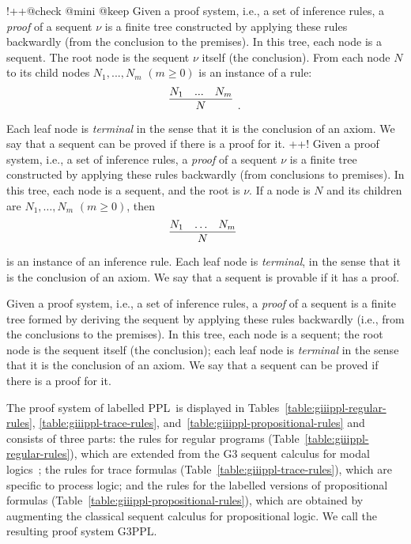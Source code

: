 \documentclass[manuscript,screen]{acmart}
\newcommand{\GiiiPPL}[0]{\mbox{G3PPL}}
\newcommand{\GiiiPPLcyc}[0]{\mbox{G3PPL}}
\newcommand{\PPL}[0]{\mbox{PPL}}
\newcommand{\A}[1]{\mbox{ \textbf{#1} }}
\newcommand{\MO}{\A{MO}}
\newcommand{\EMO}{\A{EMO}}
\begin{document}
\ifx
!++@check @mini @keep
Given a proof system, i.e., a set of inference rules, a \emph{proof} of a sequent $\nu$ is a finite tree constructed by applying these rules backwardly (from the conclusion to the premises). 
In this tree, each node is a sequent. The root node is the sequent $\nu$ itself (the conclusion). 
From each node $N$ to its child nodes $N_1,...,N_m$ $(m\ge 0)$ is an instance of a rule:
$$
\infer[]
{N}
{N_1 & ... & N_m}.
$$
Each leaf node is \emph{terminal} in the sense that it is the conclusion of an axiom. 
We say that a sequent can be proved if there is a proof for it. 
++!
\fi
Given a proof system, i.e., a set of inference rules, a \emph{proof} of a sequent $\nu$ is a finite tree constructed by applying these rules backwardly (from conclusions to premises).
In this tree, each node is a sequent, and the root is $\nu$.
If a node is $N$ and its children are $N_1,\ldots,N_m$ $(m\geq 0)$, then
$$
\infer[]
{N}
{N_1 & \ldots & N_m}
$$
is an instance of an inference rule.
Each leaf node is \emph{terminal}, in the sense that it is the conclusion of an axiom.
We say that a sequent is provable if it has a proof.

\ifx
Given a proof system, i.e., a set of inference rules, a \emph{proof} of a sequent is a finite tree formed by deriving the sequent by applying these rules backwardly (i.e., from the conclusions to the premises). 
In this tree, each node is a sequent; the root node is the sequent itself (the conclusion); each leaf node is \emph{terminal} in the sense that it is the conclusion of an axiom. 
We say that a sequent can be proved if there is a proof for it. 
\fi

The proof system of labelled \PPL\ is displayed in Tables~\ref{table:giiippl-regular-rules}, \ref{table:giiippl-trace-rules}, and~\ref{table:giiippl-propositional-rules} and consists of three parts: the rules for regular programs (Table~\ref{table:giiippl-regular-rules}), which are extended from the G3 sequent calculus for modal logics~\cite{Negri05}; the rules for trace formulas (Table~\ref{table:giiippl-trace-rules}), which are specific to process logic; and the rules for the labelled versions of propositional formulas (Table~\ref{table:giiippl-propositional-rules}), which are obtained by augmenting the classical sequent calculus for propositional logic. 
We call the resulting proof system $\GiiiPPL$. 
\end{document}
